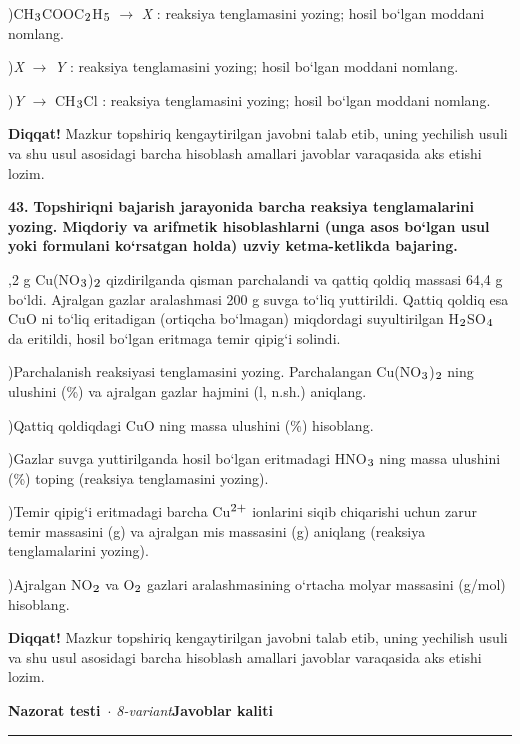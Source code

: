 \documentclass[11pt,a4paper]{article}
\renewcommand{\textsubscript}[1]{\ensuremath{_{\text{\fontsize{8}{8}\selectfont #1}}}}
\renewcommand{\textsuperscript}[1]{\ensuremath{^{\text{\fontsize{8}{8}\selectfont #1}}}}
\newcommand{\diqqat}[1]{\par\smallskip\noindent\textbf{Diqqat!} #1\par\medskip}
\begin{document}
)CH\textsubscript{3}COOC\textsubscript{2}H\textsubscript{5} $\to$ \textit{X} : reaksiya tenglamasini yozing; hosil bo`lgan moddani nomlang.\par
{})\textit{X} $\to$ \textit{Y} : reaksiya tenglamasini yozing; hosil bo`lgan moddani nomlang.\par
{})\textit{Y} $\to$ CH\textsubscript{3}Cl : reaksiya tenglamasini yozing; hosil bo`lgan moddani nomlang.\par
\diqqat{Mazkur topshiriq kengaytirilgan javobni talab etib, uning yechilish usuli va shu usul asosidagi barcha hisoblash amallari javoblar varaqasida aks etishi lozim.}
\noindent\textbf{43.} \textbf{Topshiriqni bajarish jarayonida barcha reaksiya tenglamalarini yozing. Miqdoriy va arifmetik hisoblashlarni (unga asos bo`lgan usul yoki formulani ko`rsatgan holda) uzviy ketma-ketlikda bajaring.}\par{},2 g Cu(NO\textsubscript{3})\textsubscript{2} qizdirilganda qisman parchalandi va qattiq qoldiq massasi 64,4 g bo`ldi. Ajralgan gazlar aralashmasi 200 g suvga to`liq yuttirildi. Qattiq qoldiq esa CuO ni to`liq eritadigan (ortiqcha bo`lmagan) miqdordagi suyultirilgan H\textsubscript{2}SO\textsubscript{4} da eritildi, hosil bo`lgan eritmaga temir qipig`i solindi.\par
{})Parchalanish reaksiyasi tenglamasini yozing. Parchalangan Cu(NO\textsubscript{3})\textsubscript{2} ning ulushini (\%) va ajralgan gazlar hajmini (l, n.sh.) aniqlang.\par
{})Qattiq qoldiqdagi CuO ning massa ulushini (\%) hisoblang.\par
{})Gazlar suvga yuttirilganda hosil bo`lgan eritmadagi HNO\textsubscript{3} ning massa ulushini (\%) toping (reaksiya tenglamasini yozing).\par
{})Temir qipig`i eritmadagi barcha Cu\textsuperscript{2+} ionlarini siqib chiqarishi uchun zarur temir massasini (g) va ajralgan mis massasini (g) aniqlang (reaksiya tenglamalarini yozing).\par
{})Ajralgan NO\textsubscript{2} va O\textsubscript{2} gazlari aralashmasining o`rtacha molyar massasini (g/mol) hisoblang.\par
\diqqat{Mazkur topshiriq kengaytirilgan javobni talab etib, uning yechilish usuli va shu usul asosidagi barcha hisoblash amallari javoblar varaqasida aks etishi lozim.}
\newpage
\noindent\textbf{\fontsize{13}{15}\selectfont Nazorat testi}\ \textit{$\cdot$ 8-variant}\hfill \textbf{Javoblar kaliti}\par\smallskip\hrule\smallskip
\end{document}
